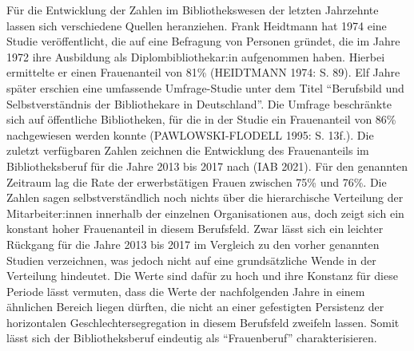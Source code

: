 \documentclass[a4paper,
fontsize=11pt,
oneside,
numbers=noperiodatend,
parskip=half-,
bibliography=totoc,
final
]{scrartcl}
\begin{document}
Für die Entwicklung der Zahlen im Bibliothekswesen der letzten
Jahrzehnte lassen sich verschiedene Quellen heranziehen. Frank Heidtmann
hat 1974 eine Studie veröffentlicht, die auf eine Befragung von Personen
gründet, die im Jahre 1972 ihre Ausbildung als Diplombibliothekar:in
aufgenommen haben. Hierbei ermittelte er einen Frauenanteil von 81\%
(HEIDTMANN 1974: S. 89). Elf Jahre später erschien eine umfassende
Umfrage-Studie unter dem Titel \enquote{Berufsbild und Selbstverständnis
der Bibliothekare in Deutschland}. Die Umfrage beschränkte sich auf
öffentliche Bibliotheken, für die in der Studie ein Frauenanteil von
86\% nachgewiesen werden konnte (PAWLOWSKI-FLODELL 1995: S. 13f.). Die
zuletzt verfügbaren Zahlen zeichnen die Entwicklung des Frauenanteils im
Bibliotheksberuf für die Jahre 2013 bis 2017 nach (IAB 2021). Für den
genannten Zeitraum lag die Rate der erwerbstätigen Frauen zwischen 75\%
und 76\%. Die Zahlen sagen selbstverständlich noch nichts über die
hierarchische Verteilung der Mitarbeiter:innen innerhalb der einzelnen
Organisationen aus, doch zeigt sich ein konstant hoher Frauenanteil in
diesem Berufsfeld. Zwar lässt sich ein leichter Rückgang für die Jahre
2013 bis 2017 im Vergleich zu den vorher genannten Studien verzeichnen,
was jedoch nicht auf eine grundsätzliche Wende in der Verteilung
hindeutet. Die Werte sind dafür zu hoch und ihre Konstanz für diese
Periode lässt vermuten, dass die Werte der nachfolgenden Jahre in einem
ähnlichen Bereich liegen dürften, die nicht an einer gefestigten
Persistenz der horizontalen Geschlechtersegregation in diesem Berufsfeld
zweifeln lassen. Somit lässt sich der Bibliotheksberuf eindeutig als
\enquote{Frauenberuf} charakterisieren.
\end{document}
